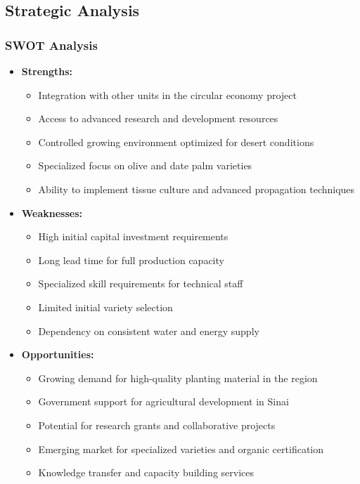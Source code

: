 \subsection{Strategic Analysis}

\subsubsection{SWOT Analysis}
\begin{itemize}
    \item \textbf{Strengths:}
    \begin{itemize}
        \item Integration with other units in the circular economy project
        \item Access to advanced research and development resources
        \item Controlled growing environment optimized for desert conditions
        \item Specialized focus on olive and date palm varieties
        \item Ability to implement tissue culture and advanced propagation techniques
    \end{itemize}
    
    \item \textbf{Weaknesses:}
    \begin{itemize}
        \item High initial capital investment requirements
        \item Long lead time for full production capacity
        \item Specialized skill requirements for technical staff
        \item Limited initial variety selection
        \item Dependency on consistent water and energy supply
    \end{itemize}
    
    \item \textbf{Opportunities:}
    \begin{itemize}
        \item Growing demand for high-quality planting material in the region
        \item Government support for agricultural development in Sinai
        \item Potential for research grants and collaborative projects
        \item Emerging market for specialized varieties and organic certification
        \item Knowledge transfer and capacity building services
    \end{itemize}
    

\end{itemize}
